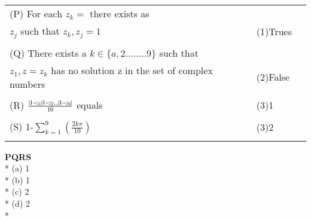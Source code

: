 \begin{enumerate}[label=\arabic*.,ref=\thesubsection.\theenumi]
\begin{tabular}{llll}
(P) For each $z_k=$ there exists as \\
$z_j$ such that $z_k,z_j=1$ &   \enspace   &   (1)Trues\\
&&&\\
(Q) There exists a $k\in \{a,2........9\}$ such that\\
 $z_1,z=z_k$ has no solution z in the set of complex numbers    &   \enspace  & (2)False\\
&&&\\
(R) $\frac{\left\vert 1-z_1\right\vert 1-z_2...\left\vert 1-z_9\right\vert}{10}$ equals   &   \enspace   & (3)1\\    
&&&\\
(S) 1-$\sum_{k=1}^{9}(\frac{2k\pi}{10})$    &   \enspace  & (3)2\\          
&&&\\
\end{tabular}
       \textbf{P}\hspace{5pt}\textbf{Q}\hspace{5pt}\textbf{R}\hspace{5pt}\textbf{S}\\*
    (a) {1}\hspace{5pt}{2}\hspace{5pt}{4}\hspace{5pt}{3}\\*     
    (b) {1}\hspace{5pt}{2}\hspace{5pt}{3}\hspace{5pt}{4}\\*
    (c) {2}\hspace{5pt}{1}\hspace{5pt}{3}\hspace{5pt}{4}\\*
    (d) {2}\hspace{5pt}{1}\hspace{5pt}{4}\hspace{5pt}{3}\\* 
\end{enumerate}
%
    
